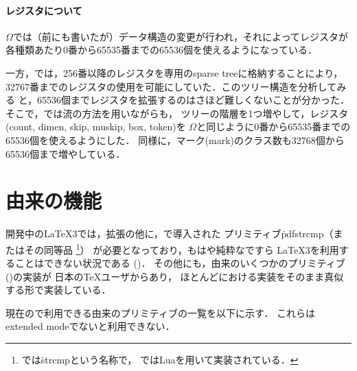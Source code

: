 \documentclass[a4paper,11pt,nomag]{jsarticle}
\newcommand{\OMEGA}{$\Omega$}
\begin{document}
\paragraph{レジスタについて}
\OMEGA では（前にも書いたが）データ構造の変更が行われ，それによってレジスタが
各種類あたり0番から65535番までの65536個を使えるようになっている．

一方，\eTeX では，256番以降のレジスタを専用のsparse treeに格納することにより，
32767番までのレジスタの使用を可能にしていた．このツリー構造を分析してみる
と，65536個までレジスタを拡張するのはさほど難しくないことが分かった．
そこで，\epTeX では\eTeX 流の方法を用いながらも，
ツリーの階層を1つ増やして，レジスタ(count, dimen, skip, muskip, box, token)を
\OMEGA と同じように0番から65535番までの65536個を使えるようにした．
同様に，マーク(mark)のクラス数も32768個から65536個まで増やしている．

\section{由来の機能}
開発中の\LaTeX 3では，\eTeX 拡張の他に，で導入された
プリミティブ\.{pdfstrcmp}（またはその同等品%
\footnote{では\.{strcmp}という名称で，
ではLuaを用いて実装されている．}）%
が必要となっており，もはや純粋な\eTeX ですら
\LaTeX 3を利用することはできない状況である (\cite{expl31,expl32,expl33})．
その他にも，由来のいくつかのプリミティブ(\cite{pdftexman})の実装が
日本の\TeX ユーザからあり，
ほとんどにおける実装をそのまま真似する形で実装している．

現在の\epTeX で利用できる由来のプリミティブの一覧を以下に示す．
これらはextended modeでないと利用できない．
\end{document}
